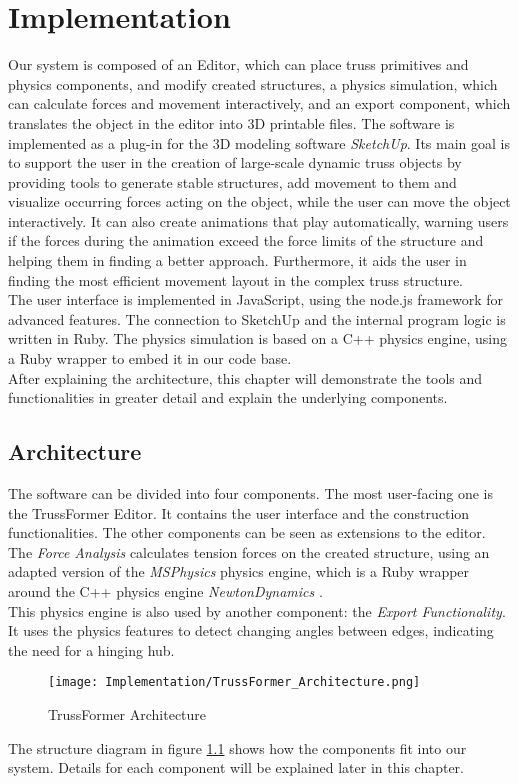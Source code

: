 \chapter{Implementation}\label{ch:implementation}
Our system is composed of an Editor, which can place truss primitives and physics components, and modify created structures, a phy\-sics simulation, which can calculate forces and movement interactively, and an export component, which translates the object in the editor into 3D printable files. The software is implemented as a plug-in for the 3D modeling software \textit{SketchUp}. Its main goal is to support the user in the creation of large-scale dynamic truss objects by providing tools to generate stable structures, add movement to them and visualize occurring forces acting on the object, while the user can move the object interactively. It can also create animations that play automatically, warning users if the forces during the animation exceed the force limits of the structure and helping them in finding a better approach. Furthermore, it aids the user in finding the most efficient movement layout in the complex truss structure.\\
The user interface is implemented in JavaScript, using the node.js framework for advanced features. The connection to SketchUp and the internal program logic is written in Ruby. The physics simulation is based on a C++ physics engine, using a Ruby wrapper to embed it in our code base.\\
After explaining the architecture, this chapter will demonstrate the tools and functionalities in greater detail and explain the underlying components.

\section{Architecture}
The software can be divided into four components. The most user-facing one is the TrussFormer Editor. It contains the user interface and the construction functionalities. The other components can be seen as extensions to the editor. The \textit{Force Analysis} calculates tension forces on the created structure, using an adapted version of the \textit{MSPhysics} \cite{MSPhysics} physics engine, which is a Ruby wrapper around the C++ physics engine \textit{NewtonDynamics} \cite{newtondynamics}.\\
This physics engine is also used by another component: the \textit{Export Functionality}. It uses the physics features to detect changing angles between edges, indicating the need for a hinging hub.
\begin{figure}[!h]
    \texttt{[image: Implementation/TrussFormer\_Architecture.png]}
    \centering
    \caption{TrussFormer Architecture}
    \label{fig:architecture}
\end{figure}
The structure diagram in figure \ref{fig:architecture} shows how the components fit into our system. Details for each component will be explained later in this chapter.

